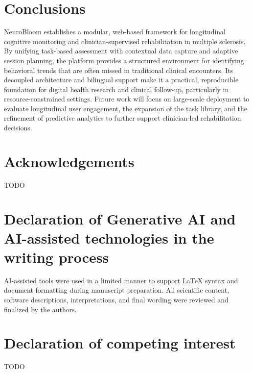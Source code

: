 \documentclass[preprint,12pt,a4paper]{elsarticle}
\begin{document}
\section{Conclusions}
NeuroBloom establishes a modular, web-based framework for longitudinal cognitive monitoring and clinician-supervised rehabilitation in multiple sclerosis. By unifying task-based assessment with contextual data capture and adaptive session planning, the platform provides a structured environment for identifying behavioral trends that are often missed in traditional clinical encounters. Its decoupled architecture and bilingual support make it a practical, reproducible foundation for digital health research and clinical follow-up, particularly in resource-constrained settings. Future work will focus on large-scale deployment to evaluate longitudinal user engagement, the expansion of the task library, and the refinement of predictive analytics to further support clinician-led rehabilitation decisions.

\section*{Acknowledgements}
TODO

\section*{Declaration of Generative AI and AI-assisted technologies in the writing process}
AI-assisted tools were used in a limited manner to support LaTeX syntax and document formatting during manuscript preparation. All scientific content, software descriptions, interpretations, and final wording were reviewed and finalized by the authors.

\section*{Declaration of competing interest}
TODO
\end{document}
